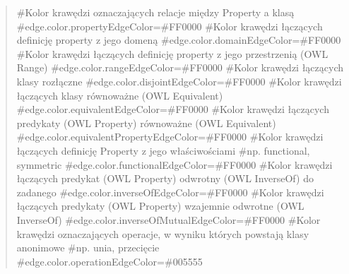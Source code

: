 \documentclass[a4paper,10pt]{article}
\begin{document}
\begin{quote}
\#Kolor krawędzi oznaczających relacje między Property a klasą \newline
\#edge.color.propertyEdgeColor=\#FF0000 \newline
 \newline
\#Kolor krawędzi łączących definicję property z jego domeną \newline
\#edge.color.domainEdgeColor=\#FF0000 \newline
 \newline
\#Kolor krawędzi łączących definicję property z jego przestrzenią (OWL Range) \newline
\#edge.color.rangeEdgeColor=\#FF0000 \newline
 \newline
\#Kolor krawędzi łączących klasy rozłączne \newline
\#edge.color.disjointEdgeColor=\#FF0000 \newline
 \newline
\#Kolor krawędzi łączących klasy równoważne (OWL Equivalent) \newline
\#edge.color.equivalentEdgeColor=\#FF0000 \newline
 \newline
\#Kolor krawędzi łączących predykaty (OWL Property) równoważne (OWL Equivalent) \newline
\#edge.color.equivalentPropertyEdgeColor=\#FF0000 \newline
 \newline
\#Kolor krawędzi łączących definicję Property z jego właściwościami \newline
\#np. functional, symmetric \newline
\#edge.color.functionalEdgeColor=\#FF0000 \newline
 \newline
\#Kolor krawędzi łączących predykat (OWL Property) odwrotny (OWL InverseOf) do zadanego \newline
\#edge.color.inverseOfEdgeColor=\#FF0000 \newline
 \newline
\#Kolor krawędzi łączących predykaty (OWL Property) wzajemnie odwrotne (OWL InverseOf) \newline
\#edge.color.inverseOfMutualEdgeColor=\#FF0000 \newline
 \newline
\#Kolor krawędzi oznaczających operacje, w wyniku których powstają klasy anonimowe \newline
\#np. unia, przecięcie \newline
\#edge.color.operationEdgeColor=\#005555 \newline
\end{quote}







%
\end{document}
